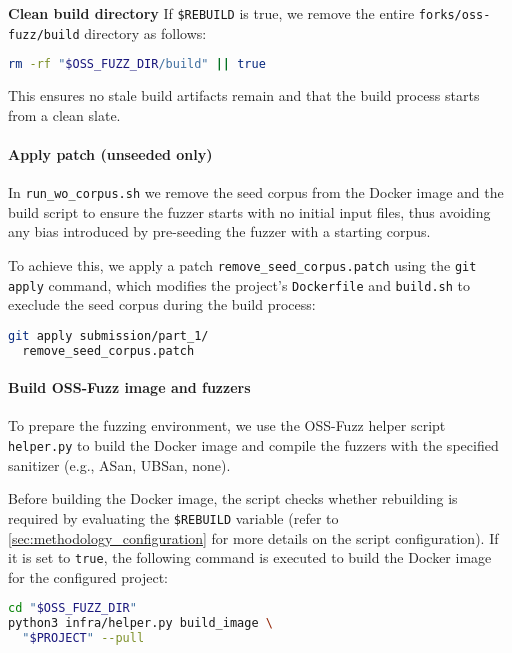 \noindent \textbf{Clean build directory} If \texttt{\$REBUILD} is true, we remove the entire \texttt{forks/oss-fuzz/build} directory as follows:

\begin{lstlisting}[language=bash, caption={Bash script to clean the OSS-Fuzz build directory with error handling}]
rm -rf "$OSS_FUZZ_DIR/build" || true
\end{lstlisting}

\noindent This ensures no stale build artifacts remain and that the build process starts from a clean slate.

\noindent \paragraph{Apply patch (unseeded only)} \label{sec:methodology_patching} In \texttt{run\_wo\_corpus.sh} we remove the seed corpus from the Docker image and the build script to ensure the fuzzer starts with no initial input files, thus avoiding any bias introduced by pre-seeding the fuzzer with a starting corpus.

To achieve this, we apply a patch \texttt{remove\_seed\_corpus.patch} using the \texttt{git apply} command, which modifies the project's \texttt{Dockerfile} and \texttt{build.sh} to execlude the seed corpus during the build process:

\begin{lstlisting}[language=bash, caption={Bash script to apply the patch to remove the seed corpus from the Docker image and build script}]
git apply submission/part_1/
  remove_seed_corpus.patch
\end{lstlisting}

\noindent \paragraph{Build OSS-Fuzz image and fuzzers} To prepare the fuzzing environment, we use the OSS-Fuzz helper script \texttt{helper.py} to build the Docker image and compile the fuzzers with the specified sanitizer (e.g., ASan, UBSan, none).

Before building the Docker image, the script checks whether rebuilding is required by evaluating the \texttt{\$REBUILD} variable (refer to \autoref{sec:methodology_configuration} for more details on the script configuration). If it is set to \texttt{true}, the following command is executed to build the Docker image for the configured project:

\begin{lstlisting}[language=bash, caption={Bash script to build the Docker image for the configured project}]
cd "$OSS_FUZZ_DIR"
python3 infra/helper.py build_image \
  "$PROJECT" --pull
\end{lstlisting}

